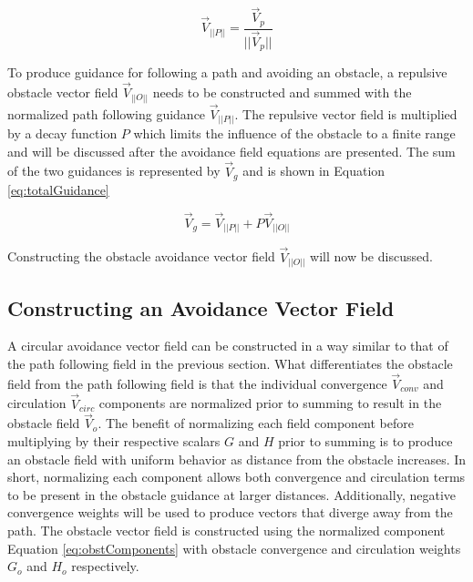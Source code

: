 \documentclass[numbered,pdftex]{ohio-etd}
\begin{document}
\begin{equation}
\overrightarrow{V}_{||P||} = \frac{\overrightarrow{V}_p}{||\overrightarrow{V}_p||}
\label{gonAllCompNormalized}
\end{equation}

To produce guidance for following a path and avoiding an obstacle, a repulsive obstacle vector field $\overrightarrow{V}_{||O||}$ needs to be constructed and summed with the normalized path following guidance $\overrightarrow{V}_{||P||}$. The repulsive vector field is multiplied by a decay function $P$ which limits the influence of the obstacle to a finite range and will be discussed after the avoidance field equations are presented. The sum of the two guidances is represented by $\overrightarrow{V}_g$ and is shown in Equation \ref{eq:totalGuidance}


\begin{equation}
\label{eq:totalGuidance}
\overrightarrow{V}_g = \overrightarrow{V}_{||P||} + P\overrightarrow{V}_{||O||}
\end{equation}

\noindent
Constructing the obstacle avoidance vector field $\overrightarrow{V}_{||O||}$ will now be discussed.

\subsection{Constructing an Avoidance Vector Field}

A circular avoidance vector field can be constructed in a way similar to that of the path following field in the previous section. What differentiates the obstacle field from the path following field is that the individual convergence $\overrightarrow{V}_{conv}$ and circulation $\overrightarrow{V}_{circ}$ components are normalized prior to summing to result in the obstacle field $\overrightarrow{V}_o$. The benefit of normalizing each field component before multiplying by their respective scalars $G$ and $H$ prior to summing is to produce an obstacle field with uniform behavior as distance from the obstacle increases. In short, normalizing each component allows both convergence and circulation terms to be present in the obstacle guidance at larger distances. Additionally, negative convergence weights will be used to produce vectors that diverge away from the path. The obstacle vector field is constructed using the normalized component Equation \ref{eq:obstComponents} with obstacle convergence and circulation weights $G_o$ and $H_o$ respectively.
\end{document}

